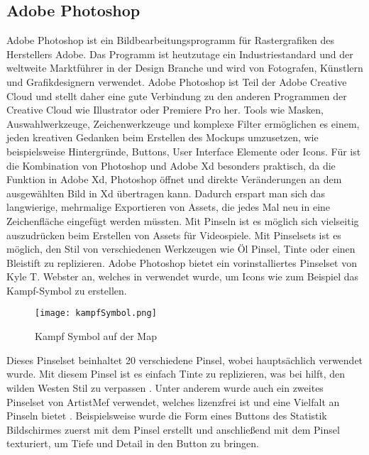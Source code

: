 \subsection{Adobe Photoshop}

Adobe Photoshop ist ein Bildbearbeitungsprogramm für Rastergrafiken des Herstellers Adobe. Das Programm ist
heutzutage ein Industriestandard und der weltweite Marktführer in der Design Branche und wird von Fotografen,
Künstlern und Grafikdesignern verwendet. Adobe Photoshop ist Teil der Adobe Creative Cloud und stellt daher eine gute
Verbindung zu den anderen Programmen der Creative Cloud wie Illustrator oder Premiere Pro her. Tools wie Masken,
Auswahlwerkzeuge, Zeichenwerkzeuge und komplexe Filter ermöglichen es einem, jeden kreativen Gedanken beim Erstellen
des \FF Mockups umzusetzen, wie beispielsweise Hintergründe, Buttons, User Interface Elemente oder Icons. 
Für \FF ist die Kombination von Photoshop und Adobe Xd besonders praktisch, da die Funktion
 in Adobe Xd,
Photoshop öffnet und direkte Veränderungen an dem ausgewählten Bild in Xd übertragen kann. Dadurch erspart man sich das langwierige, mehrmalige Exportieren von Assets, die jedes Mal neu in eine Zeichenfläche eingefügt werden müssten.
Mit Pinseln ist es möglich sich vielseitig auszudrücken beim Erstellen von Assets für Videospiele. Mit Pinselsets ist es möglich, den Stil von verschiedenen Werkzeugen wie Öl Pinsel, Tinte oder einen Bleistift zu replizieren. Adobe Photoshop bietet ein vorinstalliertes Pinselset von Kyle T. Webster an, welches in \FF verwendet wurde, um Icons wie zum Beispiel das Kampf-Symbol zu erstellen.

\begin{figure}[H]
    \centering
    \texttt{[image: kampfSymbol.png]}
    \caption{Kampf Symbol auf der Map}
\end{figure}

Dieses Pinselset beinhaltet 20 verschiedene Pinsel, wobei hauptsächlich  verwendet
wurde. Mit diesem Pinsel ist es einfach Tinte zu replizieren, was bei \FF hilft, den wilden Westen Stil zu verpassen
. Unter anderem wurde auch ein zweites Pinselset von ArtistMef verwendet, welches lizenzfrei ist und eine Vielfalt an
Pinseln bietet . Beispielsweise wurde die Form eines Buttons des Statistik Bildschirmes zuerst mit dem
 Pinsel erstellt und anschließend mit dem  Pinsel texturiert, um Tiefe und Detail in den Button zu bringen.


